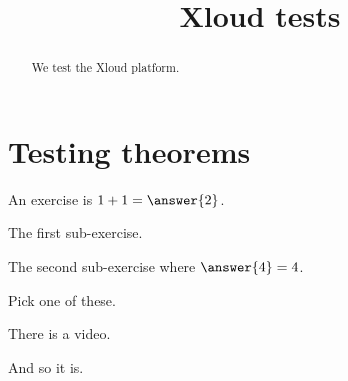 \documentclass{ximera}
\title{Xloud tests}
\begin{document}
\begin{abstract}
  We test the Xloud platform.
\end{abstract}
\maketitle
 
\section{Testing theorems}

\begin{exercise}
  An exercise is $1+1 = \answer{2}$.
  
  \begin{exercise}
    The first sub-exercise.
  \end{exercise}

  \begin{exercise}
    The second sub-exercise where $\answer{4} = 4$.
  \end{exercise}  
\end{exercise}

\begin{exercise}
  Pick one of these.
  \begin{multipleChoice}
  \end{multipleChoice}
\end{exercise}

There is a video.


And so it is.
 
\end{document}
